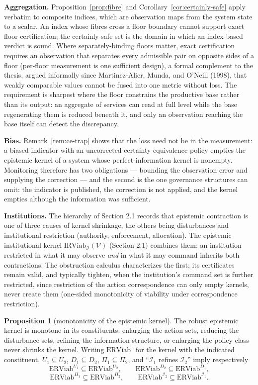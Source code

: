 \documentclass[10pt,twocolumn]{article}
\theoremstyle{definition}
\newtheorem{proposition}{Proposition}
\begin{document}
\textbf{Aggregation.} Proposition~\ref{prop:fibre} and Corollary~\ref{cor:certainly-safe} apply verbatim to
composite indices, which are observation maps from the system state to a
scalar. An index whose fibres cross a floor boundary cannot support
exact floor certification; the certainly-safe set is the domain in which an index-based verdict is sound. Where separately-binding floors matter, exact
certification requires an observation that separates every admissible
pair on opposite sides of a floor (per-floor measurement is one sufficient design), a formal complement to the thesis, argued informally since Martinez-Alier, Munda, and O'Neill (1998), that weakly comparable
values cannot be fused into one metric without loss. The requirement is
sharpest where the floor constrains the productive base rather than its
output: an aggregate of services can read at full level while the base
regenerating them is reduced beneath it, and only an observation
reaching the base itself can detect the discrepancy.

\textbf{Bias.} Remark~\ref{rem:ce-trap} shows that the loss need not be in the
measurement: a biased indicator with an uncorrected
certainty-equivalence policy empties the epistemic kernel of a system
whose perfect-information kernel is nonempty. Monitoring therefore has
two obligations --- bounding the observation error and supplying the
correction --- and the second is the one governance structures can omit: the indicator is published, the correction is not applied,
and the kernel empties although the information was sufficient.

\textbf{Institutions.} The hierarchy of Section 2.1 records that
epistemic contraction is one of three causes of kernel shrinkage, the
others being disturbances and institutional restriction (authority,
enforcement, allocation). The epistemic-institutional kernel \(\mathrm{IRViab}_{\mathcal{J}}(\mathcal{V})\) (Section 2.1) combines them: an institution restricted in what it
may observe \emph{and} in what it may command inherits both
contractions. The obstruction calculus characterizes the first; its certificates remain valid, and typically tighten, when the institution's command set is further restricted, since restriction of
the action correspondence can only empty kernels, never create them
(one-sided monotonicity of viability under correspondence restriction).

\begin{proposition}[monotonicity of the epistemic kernel]\label{prop:monotone}
The robust epistemic kernel is monotone in its constituents: enlarging
the action sets, reducing the disturbance sets, refining the information
structure, or enlarging the policy class never shrinks the kernel.
Writing \(\mathrm{ERViab}^{\,\cdot}\) for the kernel with the indicated
constituent, \(U_1\subseteq U_2\), \(D_1\subseteq D_2\),
\(\Pi_1\subseteq\Pi_2\), and ``\(\mathcal{I}_1\) refines
\(\mathcal{I}_2\)'' imply respectively
\[\mathrm{ERViab}^{U_1} \subseteq \mathrm{ERViab}^{U_2}, \qquad
\mathrm{ERViab}^{D_2} \subseteq \mathrm{ERViab}^{D_1},\]
\[\mathrm{ERViab}^{\Pi_1} \subseteq \mathrm{ERViab}^{\Pi_2}, \qquad
\mathrm{ERViab}^{\mathcal{I}_2} \subseteq \mathrm{ERViab}^{\mathcal{I}_1}.\]
\end{proposition}
\end{document}
